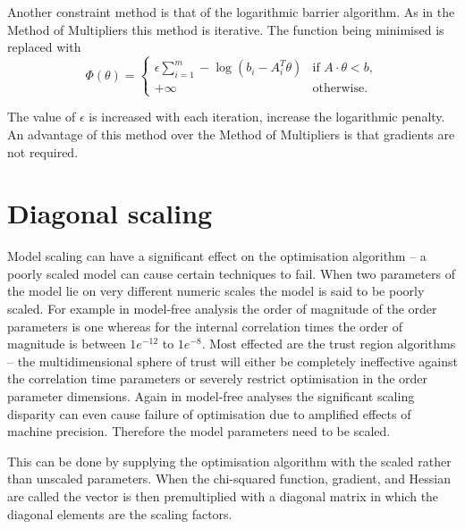 Another constraint method is that of the logarithmic barrier algorithm.
As in the Method of Multipliers this method is iterative.
The function being minimised is replaced with
\begin{equation}
  \Phi(\theta) = \begin{cases}
    \epsilon \sum_{i=1}^m -\log(b_i - A_i^T\theta) & \textrm{if } A \cdot \theta < b, \\
    +\infty & \textrm{otherwise}.
    \end{cases}
\end{equation}

The value of $\epsilon$ is increased with each iteration, increase the logarithmic penalty.
An advantage of this method over the Method of Multipliers is that gradients are not required.




\section{Diagonal scaling}
\label{sect: diagonal scaling}

Model scaling can have a significant effect on the optimisation algorithm -- a poorly scaled model can cause certain techniques to fail.
When two parameters of the model lie on very different numeric scales the model is said to be poorly scaled.
For example in model-free analysis the order of magnitude of the order parameters is one whereas for the internal correlation times the order of magnitude is between $1e^{-12}$ to $1e^{-8}$.
Most effected are the trust region algorithms -- the multidimensional sphere of trust will either be completely ineffective against the correlation time parameters or severely restrict optimisation in the order parameter dimensions.
Again in model-free analyses the significant scaling disparity can even cause failure of optimisation due to amplified effects of machine precision.
Therefore the model parameters need to be scaled.

This can be done by supplying the optimisation algorithm with the scaled rather than unscaled parameters.
When the chi-squared function, gradient, and Hessian are called the vector is then premultiplied with a diagonal matrix in which the diagonal elements are the scaling factors.
